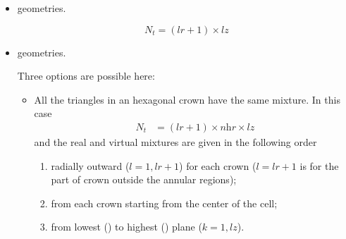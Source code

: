 \begin{itemize}
\begin{itemize}
\item All the triangles in an hexagonal crown in a given sector in a plane have the same mixture. In this case
\begin{align*}N_{t}&=6\times \textit{nhr}\times \textit{lz}\end{align*}
and the real and virtual mixtures are given in the following order 
\begin{enumerate}
\item from each crown in sector $j$ starting from the center of the cell;
\item for each sector $j=1,6$;
\item from lowest () to highest () plane ($k=1,\textit{lz}$).
\end{enumerate}

\item All the triangles contain a different mixture. In this case
\begin{align*}N_{t}&=6\times \textit{nhr}^{2}\times \textit{lz}\end{align*}
and the real and virtual mixtures are given in the following order 
\begin{enumerate}
\item from each triangle $l$ ($l=1,2\times \textit{nhc}-1$) in hexagonal crown $i$ of sector $j$.  illustrates region and surface ordering in the case where the default value of  is used and  the same information when a different value of  is provided.
\item from each crown in sector $j$ starting from the center of the cell;
\item for each sector $j=1,6$;
\item from lowest () to highest () plane ($k=1,\textit{lz}$).
\end{enumerate}
\end{itemize}

\item {} geometries.

$$N_{t}=(\textit{lr}+1)\times \textit{lz}$$

\item {} geometries.

Three options are possible here:
\begin{itemize}
\item All the triangles in an hexagonal crown have the same mixture. In this case
\begin{align*}N_{t}&=(\textit{lr}+1)\times \textit{nhr}\times \textit{lz}\end{align*}
and the real and virtual mixtures are given in the following order
\begin{enumerate}
\item radially outward ($l=1,\textit{lr}+1$) for each crown ($l=\textit{lr}+1$ is for the part of crown outside the annular regions);
\item from each crown starting from the center of the cell;
\item from lowest () to highest () plane ($k=1,\textit{lz}$).
\end{enumerate}


\end{itemize}
\end{itemize}
